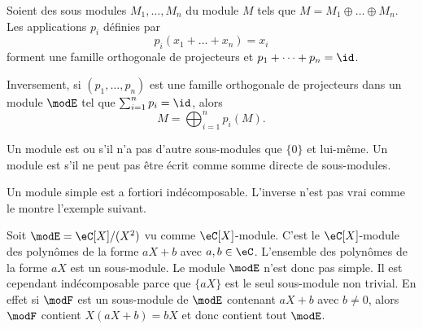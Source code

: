 \begin{theorem}     \label{ThoProjModpAlsUR}
    Soient des sous modules \( M_1,\ldots,M_n\) du module \( M \) tels que \( M=M_1\oplus\ldots\oplus M_n\). Les applications \( p_i\) définies par
    \begin{equation}
        p_i(x_1+\ldots+x_n)=x_i
    \end{equation}
    forment une famille orthogonale de projecteurs et \( p_1+\cdots +p_n=\id\).

    Inversement, si \( (p_1,\ldots, p_n)\) est une famille orthogonale de projecteurs dans un module \( \modE\) tel que \( \sum_{i=1}^np_i=\id\), alors
    \begin{equation}
        M=\bigoplus_{i=1}^np_i(M).
    \end{equation}
\end{theorem}

Un module est  ou  s'il n'a pas d'autre sous-modules que \( \{ 0 \}\) et lui-même. Un module est  s'il ne peut pas être écrit comme somme directe de sous-modules.

Un module simple est a fortiori indécomposable. L'inverse n'est pas vrai comme le montre l'exemple suivant.

\begin{example}
    Soit \( \modE=\eC[X]/(X^2)\) vu comme \( \eC[X]\)-module. C'est le \( \eC[X]\)-module des polynômes de la forme \( aX+b\) avec \( a,b\in \eC\). L'ensemble des polynômes de la forme \( aX\) est un sous-module. Le module \( \modE\) n'est donc pas simple. Il est cependant indécomposable parce que \( \{ aX \}\) est le seul sous-module non trivial. En effet si \( \modF\) est un sous-module de \( \modE\) contenant \( aX+b\) avec \( b\neq 0\), alors \( \modF\) contient \( X(aX+b)=bX\) et donc contient tout \( \modE\).
\end{example}

